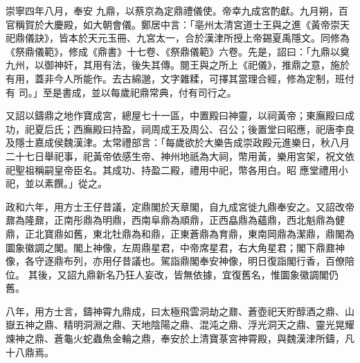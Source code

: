 \begin{pinyinscope}
 崇寧四年八月，奉安
 九鼎，以蔡京為定鼎禮儀使。帝幸九成宮酌獻。九月朔，百官稱賀於大慶殿，如大朝會儀。鄭居中言：「亳州太清宮道士王與之進《黃帝崇天祀鼎儀訣》，皆本於天元玉冊、九宮太一，合於漢津所授上帝錫夏禹隱文。同修為《祭鼎儀範》，修成《鼎書》十七卷、《祭鼎儀範》六卷。先是，詔曰：「九鼎以奠九州，以御神奸，其用有法，後失其傳。閱王與之所上《祀儀》，推鼎之意，施於有用，蓋非今人所能作。去古綿邈，文字雜糅，可擇其當理合經，修為定制，班付有
 司。」至是書成，並以每歲祀鼎常典，付有司行之。



 又詔以鑄鼎之地作寶成宮，總屋七十一區，中置殿曰神靈，以祠黃帝；東廡殿曰成功，祀夏后氏；西廡殿曰持盈，祠周成王及周公、召公；後置堂曰昭應，祀唐李良及隱士嘉成侯魏漢津。太常禮部言：「每歲欲於大樂告成崇政殿元進樂日，秋八月二十七日舉祀事，祀黃帝依感生帝、神州地祇為大祠，幣用黃，樂用宮架，祝文依祀聖祖稱嗣皇帝臣名。其成功、持盈二殿，禮用中祀，幣各用白。昭
 應堂禮用小祀，並以素饌。」從之。



 政和六年，用方士王仔昔議，定鼎閣於天章閣，自九成宮徙九鼎奉安之。又詔改帝鼐為隆鼐，正南彤鼎為明鼎，西南阜鼎為順鼎，正西皛鼎為蘊鼎，西北魁鼎為健鼎，正北寶鼎如舊，東北牡鼎為和鼎，正東蒼鼎為育鼎，東南岡鼎為潔鼎，鼎閣為圜象徽調之閣。閣上神像，左周鼎星君，中帝席星君，右大角星君；閣下鼎鼐神像，各守逐鼎布列，亦用仔昔議也。駕詣鼎閣奉安神像，明日復詣閣行香，百僚陪位。
 其後，又詔九鼎新名乃狂人妄改，皆無依據，宜復舊名，惟圜象徽調閣仍舊。



 八年，用方士言，鑄神霄九鼎成，曰太極飛雲洞劫之鼐、蒼壺祀天貯醇酒之鼎、山嶽五神之鼎、精明洞淵之鼎、天地陰陽之鼎、混沌之鼎、浮光洞天之鼎、靈光晃耀煉神之鼎、蒼龜火蛇蟲魚金輪之鼎，奉安於上清寶菉宮神霄殿，與魏漢津所鑄，凡十八鼎焉。



\end{pinyinscope}